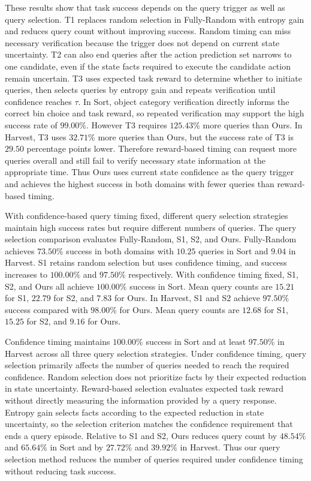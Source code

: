 These results show that task success depends on the query trigger as well as query selection. T1 replaces random selection in Fully-Random with entropy gain and reduces query count without improving success. Random timing can miss necessary verification because the trigger does not depend on current state uncertainty. T2 can also end queries after the action prediction set narrows to one candidate, even if the state facts required to execute the candidate action remain uncertain. T3 uses expected task reward to determine whether to initiate queries, then selects queries by entropy gain and repeats verification until confidence reaches $\tau$. In Sort, object category verification directly informs the correct bin choice and task reward, so repeated verification may support the high success rate of $99.00\%$. However T3 requires $125.43\%$ more queries than Ours. In Harvest, T3 uses $32.71\%$ more queries than Ours, but the success rate of T3 is $29.50$ percentage points lower. Therefore reward-based timing can request more queries overall and still fail to verify necessary state information at the appropriate time. Thus Ours uses current state confidence as the query trigger and achieves the highest success in both domains with fewer queries than reward-based timing.

With confidence-based query timing fixed, different query selection strategies maintain high success rates but require different numbers of queries. The query selection comparison evaluates Fully-Random, S1, S2, and Ours. Fully-Random achieves $73.50\%$ success in both domains with $10.25$ queries in Sort and $9.04$ in Harvest. S1 retains random selection but uses confidence timing, and success increases to $100.00\%$ and $97.50\%$ respectively. With confidence timing fixed, S1, S2, and Ours all achieve $100.00\%$ success in Sort. Mean query counts are $15.21$ for S1, $22.79$ for S2, and $7.83$ for Ours. In Harvest, S1 and S2 achieve $97.50\%$ success compared with $98.00\%$ for Ours. Mean query counts are $12.68$ for S1, $15.25$ for S2, and $9.16$ for Ours.

Confidence timing maintains $100.00\%$ success in Sort and at least $97.50\%$ in Harvest across all three query selection strategies. Under confidence timing, query selection primarily affects the number of queries needed to reach the required confidence. Random selection does not prioritize facts by their expected reduction in state uncertainty. Reward-based selection evaluates expected task reward without directly measuring the information provided by a query response. Entropy gain selects facts according to the expected reduction in state uncertainty, so the selection criterion matches the confidence requirement that ends a query episode. Relative to S1 and S2, Ours reduces query count by $48.54\%$ and $65.64\%$ in Sort and by $27.72\%$ and $39.92\%$ in Harvest. Thus our query selection method reduces the number of queries required under confidence timing without reducing task success.

